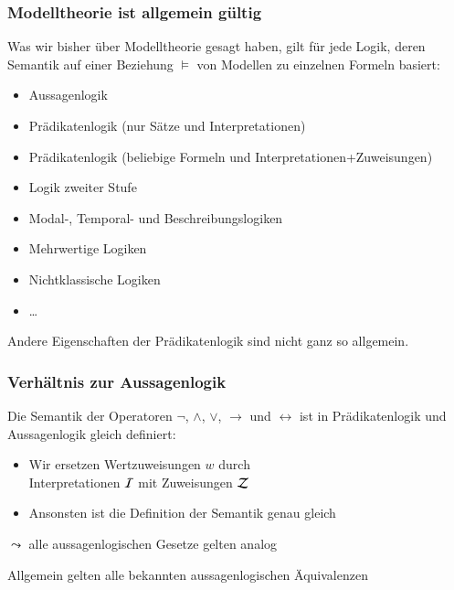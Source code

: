 \documentclass[aspectratio=1610,onlymath]{beamer}
\begin{document}
\begin{frame}\frametitle{Modelltheorie ist allgemein gültig}

Was wir bisher über Modelltheorie gesagt haben, gilt für jede
Logik, deren Semantik auf einer Beziehung $\models$ von Modellen
zu einzelnen Formeln basiert:
\begin{itemize}
\item Aussagenlogik
\item Prädikatenlogik (nur Sätze und Interpretationen)
\item Prädikatenlogik (beliebige Formeln und Interpretationen+Zuweisungen)
\item Logik zweiter Stufe
\item Modal-, Temporal- und Beschreibungslogiken
\item Mehrwertige Logiken
\item Nichtklassische Logiken
\item \ldots
\end{itemize}

Andere Eigenschaften der Prädikatenlogik sind nicht ganz so allgemein.

\end{frame}



\begin{frame}\frametitle{Verhältnis zur Aussagenlogik}

Die Semantik der Operatoren $\neg$, $\wedge$, $\vee$, $\to$ und $\leftrightarrow$ ist
in Prädikatenlogik und Aussagenlogik gleich definiert:
\begin{itemize}
\item Wir ersetzen Wertzuweisungen $w$ durch\\
	Interpretationen $\mathcal{I}$ mit Zuweisungen $\mathcal{Z}$
\item Ansonsten ist die Definition der Semantik genau gleich
\end{itemize}
$\leadsto$ alle aussagenlogischen Gesetze gelten analog
\bigskip\pause


Allgemein gelten alle bekannten aussagenlogischen Äquivalenzen

\end{frame}
\end{document}
